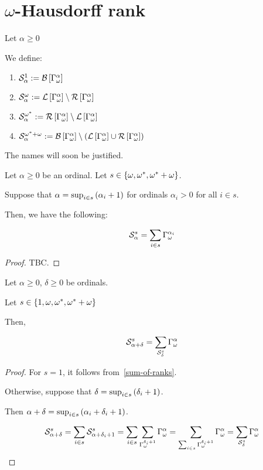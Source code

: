 \section{\texorpdfstring{$\omega$}{omega}-Hausdorff rank}

\begin{definitions}
  Let $\alpha \ge 0$

  We define:
  \begin{enumerate}
    \item $\mathcal{S}^{1}_{\alpha} := \mathcal{B} \left[ {{\Gamma_{\omega}^{\alpha}}} \right]$
    \item $\mathcal{S}^{\omega}_{\alpha} := \mathcal{L} \left[ {{\Gamma_{\omega}^{\alpha}}} \right] \setminus \mathcal{R} \left[ {{\Gamma_{\omega}^{\alpha}}} \right]$
    \item $\mathcal{S}^{\omega^\ast}_{\alpha} := \mathcal{R} \left[ {{\Gamma_{\omega}^{\alpha}}} \right] \setminus \mathcal{L} \left[ {{\Gamma_{\omega}^{\alpha}}} \right]$
    \item $\mathcal{S}^{\omega^\ast + \omega}_{\alpha} := \mathcal{B} \left[ {{\Gamma_{\omega}^{\alpha}}} \right] \setminus \left( { \mathcal{L} \left[ {{\Gamma_{\omega}^{\alpha}}} \right] \cup \mathcal{R} \left[ {{\Gamma_{\omega}^{\alpha}}} \right] } \right)$
  \end{enumerate}

  The names will soon be justified.
\end{definitions}

\begin{lemma}\label{b_alpha-structure-lemma}
  Let $\alpha \ge 0$ be an ordinal.
  Let $s \in \left\{ {\omega, \omega^\ast, \omega^\ast + \omega} \right\}$.

  Suppose that
  $\alpha = \sup_{i \in s} \left( {\alpha_i + 1} \right)$ for
  ordinals $\alpha_i > 0$ for all $i \in s$.

  Then, we have the following:

  \[
    \mathcal{S}^{s}_{\alpha} = \sum_{i \in s}{\Gamma_{\omega}^{\alpha_i}}
  \]
\end{lemma}

\begin{proof}
  TBC.
\end{proof}

\begin{corollary}
  Let $\alpha \ge 0$, $\delta \ge 0$ be ordinals.

  Let $s \in \left\{ {1, \omega, \omega^\ast, \omega^\ast + \omega} \right\}$

  Then,

  \[
    \mathcal{S}^{s}_{\alpha + \delta}
    = \sum_{\mathcal{S}^{s}_{\delta}}{\Gamma_{\omega}^{\alpha}}
  \]
\end{corollary}

\begin{proof}

  For $s = 1$, it follows from~\cref{sum-of-ranks}.

  Otherwise, suppose that $\delta = \sup_{i \in s} \left( {\delta_i + 1} \right)$.

  Then $\alpha + \delta = \sup_{i \in s} \left( {\alpha_i + \delta_i + 1} \right)$.

  \[
    \mathcal{S}^{s}_{\alpha + \delta}
    = \sum_{i \in s}{\mathcal{S}^{s}_{\alpha + \delta_i + 1}}
    = \sum_{i \in s}\sum_{\Gamma_{\omega}^{\delta_i + 1}}{\Gamma_{\omega}^{\alpha}}
    = \sum_{\sum_{i \in s}{\Gamma_{\omega}^{\delta_i + 1}}}{\Gamma_{\omega}^{\alpha}}
    = \sum_{\mathcal{S}^{s}_{\delta}}{\Gamma_{\omega}^{\alpha}}
  \]
\end{proof}
